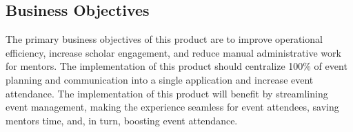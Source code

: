 \subsection{Business Objectives}
The primary business objectives of this product are to improve operational
efficiency, increase scholar engagement, and reduce manual administrative work
for mentors. The implementation of this product should centralize 100\% of event
planning and communication into a single application and increase event
attendance. The implementation of this product will benefit {\ClientName} by
streamlining event management, making the experience seamless for event
attendees, saving mentors time, and, in turn, boosting event attendance.
